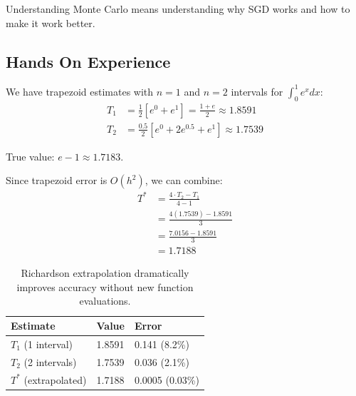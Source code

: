  Understanding Monte Carlo means understanding why SGD works and how to make it work better.



\newpage
\subsection{Hands On Experience}

 We have trapezoid estimates with $n = 1$ and $n = 2$ intervals for $\int_0^1 e^x dx$:
\begin{align*}
    T_1 &= \frac{1}{2}[e^0 + e^1] = \frac{1 + e}{2} \approx 1.8591 \\
    T_2 &= \frac{0.5}{2}[e^0 + 2e^{0.5} + e^1] \approx 1.7539
\end{align*}

True value: $e - 1 \approx 1.7183$.

\vspace{1em}
 Since trapezoid error is $O(h^2)$, we can combine:
\begin{align*}
    T^* &= \frac{4 \cdot T_2 - T_1}{4 - 1} \\
    &= \frac{4(1.7539) - 1.8591}{3} \\
    &= \frac{7.0156 - 1.8591}{3} \\
    &= 1.7188
\end{align*}


\begin{table}[ht]
\centering
\begin{tabular}{p{}p{}p{}}
\toprule
\textbf{Estimate} & \textbf{Value} & \textbf{Error} \\
\midrule
$T_1$ (1 interval) & 1.8591 & 0.141 (8.2\%) \\
$T_2$ (2 intervals) & 1.7539 & 0.036 (2.1\%) \\
$T^*$ (extrapolated) & 1.7188 & 0.0005 (0.03\%) \\
\bottomrule
\end{tabular}
\vspace{2em}
\caption{Richardson extrapolation dramatically improves accuracy without new function evaluations.}
\label{tab:richardson_comparison}
\end{table}

